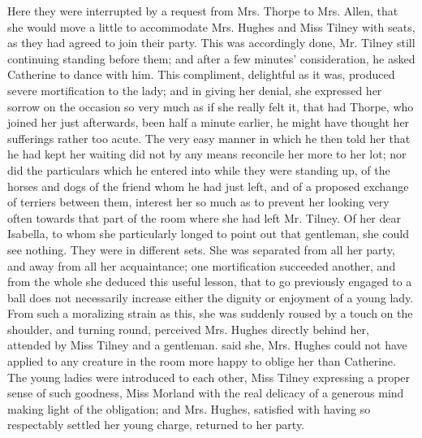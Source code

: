 


Here they were interrupted by a request from Mrs. Thorpe to Mrs. Allen, that she would move a little to accommodate Mrs. Hughes and Miss Tilney with seats, as they had agreed to join their party. This was accordingly done, Mr. Tilney still continuing standing before them; and after a few minutes' consideration, he asked Catherine to dance with him. This compliment, delightful as it was, produced severe mortification to the lady; and in giving her denial, she expressed her sorrow on the occasion so very much as if she really felt it, that had Thorpe, who joined her just afterwards, been half a minute earlier, he might have thought her sufferings rather too acute. The very easy manner in which he then told her that he had kept her waiting did not by any means reconcile her more to her lot; nor did the particulars which he entered into while they were standing up, of the horses and dogs of the friend whom he had just left, and of a proposed exchange of terriers between them, interest her so much as to prevent her looking very often towards that part of the room where she had left Mr. Tilney. Of her dear Isabella, to whom she particularly longed to point out that gentleman, she could see nothing. They were in different sets. She was separated from all her party, and away from all her acquaintance; one mortification succeeded another, and from the whole she deduced this useful lesson, that to go previously engaged to a ball does not necessarily increase either the dignity or enjoyment of a young lady. From such a moralizing strain as this, she was suddenly roused by a touch on the shoulder, and turning round, perceived Mrs. Hughes directly behind her, attended by Miss Tilney and a gentleman.  said she,  Mrs. Hughes could not have applied to any creature in the room more happy to oblige her than Catherine. The young ladies were introduced to each other, Miss Tilney expressing a proper sense of such goodness, Miss Morland with the real delicacy of a generous mind making light of the obligation; and Mrs. Hughes, satisfied with having so respectably settled her young charge, returned to her party.

